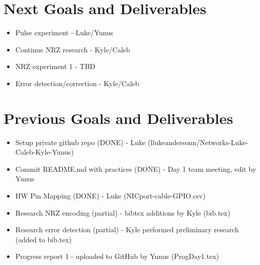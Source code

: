 \documentclass{article}
\begin{document}
\section*{Next Goals and Deliverables}
\begin{itemize}
\item Pulse experiment - Luke/Yunus
\item Continue NRZ research - Kyle/Caleb
\item NRZ experiment 1 - TBD
\item Error detection/correction - Kyle/Caleb
\end{itemize}
\section*{Previous Goals and Deliverables}
\begin{itemize}
\item Setup private github repo (DONE) - Luke (llukeandersonn/Networks-Luke-Caleb-Kyle-Yunus)
\item Commit README.md with practices (DONE) - Day 1 team meeting, edit by Yunus
\item HW Pin Mapping (DONE) - Luke (NICport-cable-GPIO.csv)
\item Research NRZ encoding (partial) - bibtex additions by Kyle (bib.tex)
\item Research error detection (partial) - Kyle performed preliminary research (added to bib.tex)
\item Progress report 1 - uploaded to GitHub by Yunus (ProgDay1.tex)
\end{itemize}
\end{document}
